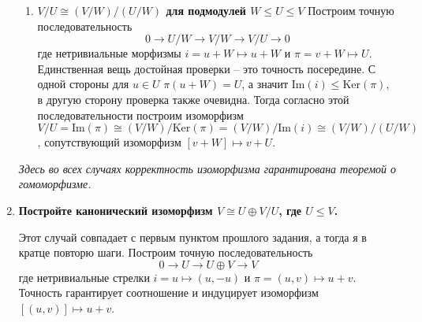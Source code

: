 \documentclass{article}
\begin{document}
\begin{enumerate}
\begin{enumerate}
            \item \textbf{$V/U\cong(V/W)/(U/W)$ для подмодулей $W\leq U\leq V$}
                Построим точную последовательность
                \[0\rightarrow U/W\rightarrow V/W\rightarrow V/U\rightarrow 0\]
                где нетривиальные морфизмы $i=u+W\mapsto u+W$ и $\pi=v+W\mapsto U$. Единственная вещь достойная проверки
                – это точность посередине. С одной стороны для $u\in U$ $\pi(u+W)=U$, а значит $\text{Im}(i)\leq
                \text{Ker}(\pi)$, в другую сторону проверка также очевидна. Тогда согласно этой последовательности
                построим изоморфизм $V/U=\text{Im}(\pi)\cong (V/W)/\text{Ker}(\pi)=(V/W)/\text{Im}(i)\cong(V/W)/(U/W)$,
                сопутствующий изоморфизм $[v+W]\mapsto v+U$.
        \end{enumerate}
        \textit{Здесь во всех случаях корректность изоморфизма гарантирована теоремой о гомоморфизме.}

    \item \textbf{Постройте канонический изоморфизм $V\cong U\oplus V/U$, где $U\leq V$.}

        Этот случай совпадает с первым пунктом прошлого задания, а тогда я в кратце повторю шаги. Построим точную
        последовательность
        \[0\rightarrow U\rightarrow U\oplus V\rightarrow V\]
        где нетривиальные стрелки $i=u\mapsto (u,-u)$ и $\pi=(u,v)\mapsto u+v$. Точность гарантирует соотношение
        и индуцирует изоморфизм $[(u,v)]\mapsto u+v$.
\end{enumerate}
\end{document}
